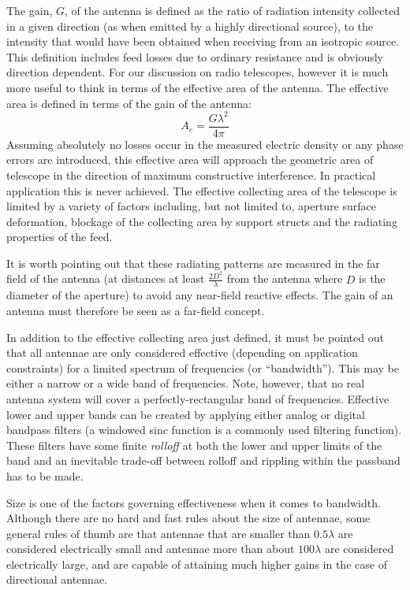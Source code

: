 \documentclass[a4paper,10pt]{report}
\begin{document}
The gain, $G$, of the antenna is defined as the ratio of radiation intensity collected in a given direction (as when emitted by a highly 
directional source), to the intensity that would have been obtained when receiving from an isotropic source. This definition includes feed losses
due to ordinary resistance and is obviously direction dependent. For our discussion on radio telescopes, however it is much more useful to think in terms of 
the effective area of the antenna. The effective area is defined in terms of the gain of the antenna:
\begin{equation*}
 A_e = \frac{G\lambda^2}{4\pi}
\end{equation*}
Assuming absolutely no losses occur in the measured electric density or any phase errors are introduced, this effective area will approach the geometric area of telescope in the direction
of maximum constructive interference. In practical application this is never achieved. The effective collecting area of the telescope is limited by a variety of
factors including, but not limited to, aperture surface deformation, blockage of the collecting area by support structs and the radiating properties of the feed.

It is worth pointing out that these radiating patterns are measured in the far field of the antenna (at distances at least $\frac{2D^2}{\lambda}$ from
the antenna where $D$ is the diameter of the aperture) to avoid any near-field reactive effects. The gain of an antenna must therefore be seen as a 
far-field concept.

In addition to the effective collecting area just defined, it must be pointed out that all antennae are only considered 
effective (depending on application constraints) for a limited spectrum of frequencies (or ``bandwidth''). This may be 
either a narrow or a wide band of frequencies. Note, however, that no real antenna system will cover a perfectly-rectangular band 
of frequencies. Effective lower and upper bands can be created by applying either analog or digital bandpass filters 
(a windowed sinc function is a commonly used filtering function). These filters have some finite \textit{rolloff} at both 
the lower and upper limits of the band and an inevitable trade-off between rolloff and rippling within the passband has to be made. 

Size is one of the factors governing effectiveness when it comes to bandwidth. Although there are no hard and fast rules about the size of antennae, 
some general rules of thumb are that antennae that are smaller than $0.5\lambda$ are considered electrically small and antennae more than 
about $100\lambda$ are considered electrically large, and are capable of attaining much higher gains in the case of directional antennae.
\end{document}
